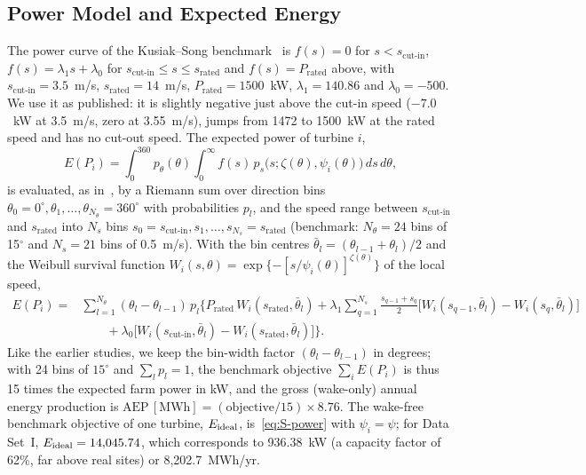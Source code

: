 \subsection{Power Model and Expected Energy}
\label{sec:powermodel}
\label{sec:S-power}
The power curve of the Kusiak--Song benchmark~\cite{Kusiak2010} is $f(s)=0$ for $s<s_{\text{cut-in}}$, $f(s)=\lambda_1 s+\lambda_0$ for $s_{\text{cut-in}}\le s\le s_{\text{rated}}$ and $f(s)=P_{\text{rated}}$ above, with $s_{\text{cut-in}}=3.5$~m/s, $s_{\text{rated}}=14$~m/s, $P_{\text{rated}}=1500$~kW, $\lambda_1=140.86$ and $\lambda_0=-500$. We use it as published: it is slightly negative just above the cut-in speed ($-7.0$~kW at 3.5~m/s, zero at 3.55~m/s), jumps from 1472 to 1500~kW at the rated speed and has no cut-out speed. The expected power of turbine $i$,
\begin{equation}\label{eq8}
E(P_i) = \int_0^{360} p_\theta(\theta) \int_0^{\infty} f(s)\,
       p_s\bigl(s; \zeta(\theta), \psi_i(\theta)\bigr) \, ds \, d\theta ,
\end{equation}
is evaluated, as in~\cite{Kusiak2010}, by a Riemann sum over direction bins $\theta_0 = 0^\circ, \theta_1, \ldots, \theta_{N_\theta} = 360^\circ$ with probabilities $p_l$, and the speed range between $s_{\text{cut-in}}$ and $s_{\text{rated}}$ into $N_s$ bins $s_0 = s_{\text{cut-in}}, s_1, \ldots, s_{N_s} = s_{\text{rated}}$ (benchmark: $N_\theta=24$ bins of 15$^\circ$ and $N_s=21$ bins of 0.5~m/s). With the bin centres $\bar\theta_l=(\theta_{l-1}+\theta_l)/2$ and the Weibull survival function $W_i(s,\theta)=\exp\{-[s/\psi_i(\theta)]^{\zeta(\theta)}\}$ of the local speed,
\begin{equation}
\begin{split}
E(P_i) ={}& \sum_{l=1}^{N_\theta} (\theta_l - \theta_{l-1})\, p_l \Bigg\{ P_{\text{rated}}\, W_i(s_{\text{rated}},\bar\theta_l)
+\lambda_1 \sum_{q=1}^{N_s} \tfrac{s_{q-1} + s_q}{2}\bigl[W_i(s_{q-1},\bar\theta_l)-W_i(s_q,\bar\theta_l)\bigr]\\
&\qquad+ \lambda_0 \bigl[W_i(s_{\text{cut-in}},\bar\theta_l)-W_i(s_{\text{rated}},\bar\theta_l)\bigr] \Bigg\}.
\end{split}
\label{eq:S-power}
\end{equation}
Like the earlier studies, we keep the bin-width factor $(\theta_l-\theta_{l-1})$ in degrees; with 24 bins of $15^\circ$ and $\sum_l p_l=1$, the benchmark objective $\sum_i E(P_i)$ is thus 15 times the expected farm power in kW, and the gross (wake-only) annual energy production is $\mathrm{AEP}\,[\mathrm{MWh}] = (\text{objective}/15)\times 8.76$. The wake-free benchmark objective of one turbine, $E_{\rm ideal}$, is~\eqref{eq:S-power} with $\psi_i=\psi$; for Data Set~I, $E_{\rm ideal}=14{,}045.74$, which corresponds to 936.38~kW (a capacity factor of 62\%, far above real sites) or 8,202.7~MWh/yr.

